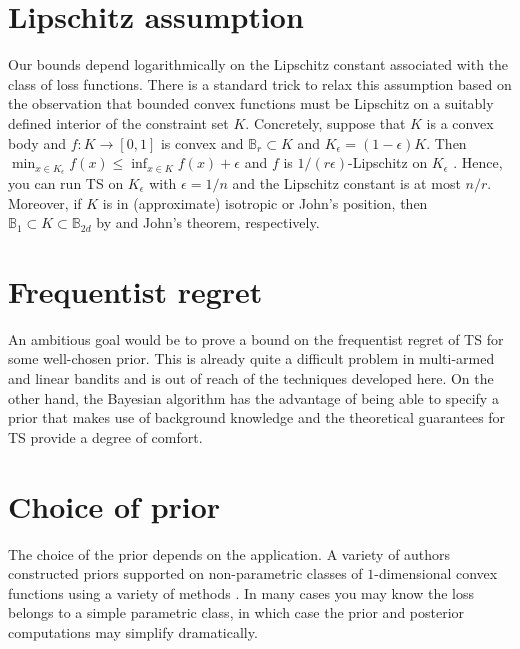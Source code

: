 \documentclass[letter, 12pt]{report}
\newcommand{\ball}{\mathbb{B}}
\newcommand{\1}{\mathbf{1}}
\newcommand{\ts}{\textsc{TS}\xspace}
\theoremstyle{plain}
\theoremstyle{definition}
\theoremstyle{remark}
\begin{document}
\section{Lipschitz assumption} Our bounds depend logarithmically on the Lipschitz constant associated with the class of loss functions.
There is a standard trick to relax this assumption based on the observation that bounded convex functions must be Lipschitz on a suitably defined
interior of the constraint set $K$.
Concretely, suppose that $K$ is a convex body and $f : K \to [0,1]$ is convex and $\ball_r \subset K$ and $K_\epsilon = (1 - \epsilon) K$.
Then $\min_{x \in K_\epsilon} f(x) \leq \inf_{x \in K} f(x) + \epsilon$ and $f$ is $1/(r\epsilon)$-Lipschitz on $K_\epsilon$ \citep[Chapter 3]{lat24book}.
Hence, you can run \ts{} on $K_\epsilon$ with $\epsilon = 1/n$ and the Lipschitz constant is at most $n/r$.
Moreover, if $K$ is in (approximate) isotropic or John's position, then $\ball_1 \subset K \subset \ball_{2d}$ by \cite{kannan1995isoperimetric}
and John's theorem, respectively.

\section{Frequentist regret}
An ambitious goal would be to prove a bound on the frequentist regret of \ts{} for some well-chosen prior.
This is already quite a difficult problem in multi-armed \citep{KKM12,AG12b} and linear bandits \citep{AG13} and is out of reach of the techniques developed here.
On the other hand, the Bayesian algorithm has the advantage of being able to specify a prior that makes use of background knowledge and the theoretical guarantees
for \ts{} provide a degree of comfort.

\section{Choice of prior} The choice of the prior depends on the application. A variety of authors constructed priors supported on non-parametric
classes of $1$-dimensional convex functions
using a variety of methods \citep{ramgopal1993nonparametric,chang2007shape,shively2011nonparametric}.
In many cases you may know the loss belongs to a simple parametric class, in which case the prior and posterior computations may simplify dramatically.

\renewcommand{\bibname}{References}


\end{document}
